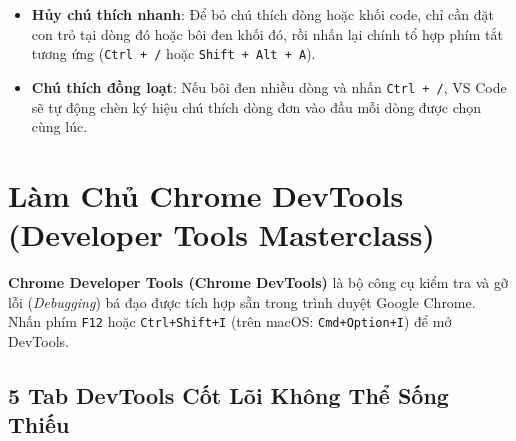 \documentclass[11pt,oneside]{book}
\newcommand{\term}[1]{\textbf{\textcolor{primaryBlue}{#1}}}
\begin{document}
\begin{tipBox}
\begin{itemize}[leftmargin=1.8em, itemsep=2pt, parsep=0pt]
    \item \textbf{Hủy chú thích nhanh}: Để bỏ chú thích dòng hoặc khối code, chỉ cần đặt con trỏ tại dòng đó hoặc bôi đen khối đó, rồi nhấn lại chính tổ hợp phím tắt tương ứng (\texttt{Ctrl + /} hoặc \texttt{Shift + Alt + A}).
    \item \textbf{Chú thích đồng loạt}: Nếu bôi đen nhiều dòng và nhấn \texttt{Ctrl + /}, VS Code sẽ tự động chèn ký hiệu chú thích dòng đơn vào đầu mỗi dòng được chọn cùng lúc.
\end{itemize}
\end{tipBox}

\section{Làm Chủ Chrome DevTools (Developer Tools Masterclass)}

\term{Chrome Developer Tools (Chrome DevTools)} là bộ công cụ kiểm tra và gỡ lỗi (\textit{Debugging}) bá đạo được tích hợp sẵn trong trình duyệt Google Chrome. Nhấn phím \texttt{F12} hoặc \texttt{Ctrl+Shift+I} (trên macOS: \texttt{Cmd+Option+I}) để mở DevTools.

\subsection{5 Tab DevTools Cốt Lõi Không Thể Sống Thiếu}
\end{document}
